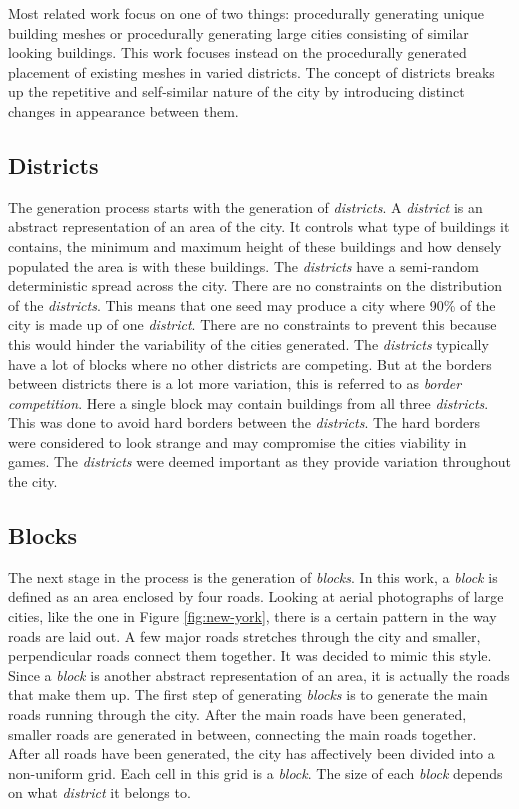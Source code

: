 Most related work focus on one of two things: procedurally generating unique building meshes\cite{PseudoInfiniteCities} or procedurally generating large cities consisting of similar looking buildings\cite{InfiniteCities}. This work focuses instead on the procedurally generated placement of existing meshes in varied districts. The concept of districts breaks up the repetitive and self-similar nature of the city by introducing distinct changes in appearance between them.

	\subsection{Districts}
	The generation process starts with the generation of \textit{districts}. A \textit{district} is an abstract representation of an area of the city. It controls what type of buildings it contains, the minimum and maximum height of these buildings and how densely populated the area is with these buildings. The \textit{districts} have a semi-random deterministic spread across the city. There are no constraints on the distribution of the \textit{districts}. This means that one seed may produce a city where 90\% of the city is made up of one \textit{district}. There are no constraints to prevent this because this would hinder the variability of the cities generated. The \textit{districts} typically have a lot of blocks where no other districts are competing. But at the borders between districts there is a lot more variation, this is referred to as \textit{border competition}. Here a single block may contain buildings from all three \textit{districts}. This was done to avoid hard borders between the \textit{districts}. The hard borders were considered to look strange and may compromise the cities viability in games. The \textit{districts} were deemed important as they provide variation throughout the city.
		
	\subsection{Blocks}
	The next stage in the process is the generation of \textit{blocks}. In this work, a \textit{block} is defined as an area enclosed by four roads. Looking at aerial photographs of large cities, like the one in Figure \ref{fig:new-york}, there is a certain pattern in the way roads are laid out. A few major roads stretches through the city and smaller, perpendicular roads connect them together. It was decided to mimic this style. Since a \textit{block} is another abstract representation of an area, it is actually the roads that make them up. The first step of generating \textit{blocks} is to generate the main roads running through the city. After the main roads have been generated, smaller roads are generated in between, connecting the main roads together. After all roads have been generated, the city has affectively been divided into a non-uniform grid. Each cell in this grid is a \textit{block}. The size of each \textit{block} depends on what \textit{district} it belongs to.
	
